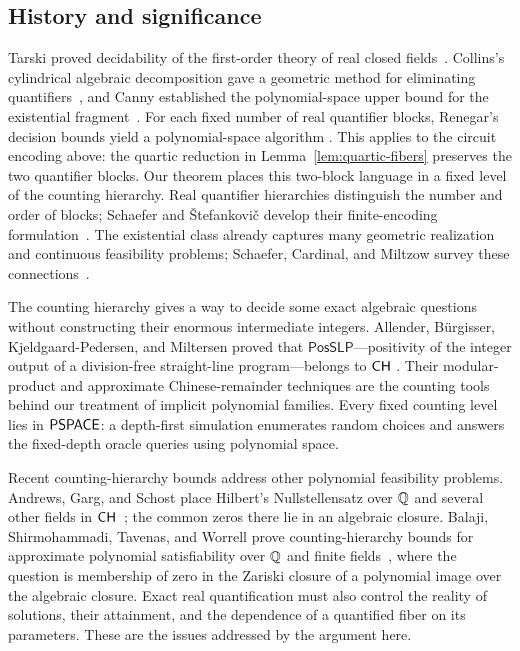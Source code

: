 \subsection{History and significance}

Tarski proved decidability of the first-order theory of real closed
fields~\cite{Tarski1951}. Collins's cylindrical algebraic decomposition
gave a geometric method for eliminating quantifiers~\cite{Collins1975},
and Canny established the polynomial-space upper bound for the existential
fragment~\cite{Canny1988}. For each fixed number of real quantifier blocks,
Renegar's decision bounds yield a polynomial-space algorithm
\cite[Theorem~1.1]{Renegar1992II}. This applies to the circuit encoding
above: the quartic reduction in Lemma~\ref{lem:quartic-fibers} preserves
the two quantifier blocks. Our theorem places this two-block language
in a fixed level of the counting hierarchy.
Real quantifier hierarchies distinguish the
number and order of blocks; Schaefer and \v{S}tefankovi\v{c} develop their
finite-encoding formulation~\cite{SchaeferStefankovic2025}.
The existential class already captures many geometric realization and
continuous feasibility problems; Schaefer, Cardinal, and Miltzow survey
these connections~\cite{SchaeferCardinalMiltzow2026}.

The counting hierarchy gives a way to decide some exact algebraic
questions without constructing their enormous intermediate integers.
Allender, B\"urgisser, Kjeldgaard-Pedersen, and Miltersen proved that
$\mathsf{PosSLP}$---positivity of the integer output of a division-free
straight-line program---belongs to $\mathsf{CH}$
\cite{AllenderBurgisserKjeldgaardPedersenMiltersen2009}.
Their modular-product and approximate Chinese-remainder techniques are
the counting tools behind our treatment of implicit polynomial families.
Every fixed counting level lies in $\mathsf{PSPACE}$: a depth-first simulation
enumerates random choices and answers the fixed-depth oracle queries
using polynomial space.

Recent counting-hierarchy bounds address other polynomial feasibility
problems. Andrews, Garg, and Schost place Hilbert's Nullstellensatz over
$\mathbb Q$ and several other fields in $\mathsf{CH}$~\cite{AndrewsGargSchost2026};
the common zeros there lie in an algebraic closure.
Balaji, Shirmohammadi, Tavenas, and Worrell prove counting-hierarchy
bounds for approximate polynomial satisfiability over $\mathbb Q$ and finite
fields~\cite{BalajiShirmohammadiTavenasWorrell2026}, where the question
is membership of zero in the Zariski closure of a polynomial image
over the algebraic closure.
Exact real quantification must also control the reality of solutions,
their attainment, and the dependence of a quantified fiber on its
parameters. These are the issues addressed by the argument here.

